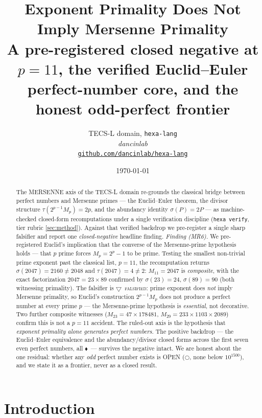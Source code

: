 \documentclass[11pt,a4paper]{article}
\title{
  \textbf{Exponent Primality Does Not Imply Mersenne Primality}\\[4pt]
  \large A pre-registered closed negative at $p=11$, the verified
  Euclid--Euler perfect-number core, and the honest odd-perfect frontier
}
\author{
  TECS-L domain, \texttt{hexa-lang}\\
  \normalsize\textit{dancinlab}\\[2pt]
  \normalsize\href{https://github.com/dancinlab/hexa-lang}{\texttt{github.com/dancinlab/hexa-lang}}
}
\date{\today}
\newcommand{\tierF}{\textcolor{blue!60!black}{$\blacklozenge$}}   %
\newcommand{\tierX}{\textcolor{red!70!black}{$\bigtriangledown$}}  %
\newcommand{\tierO}{\textcolor{orange!85!black}{$\bigcirc$}}       %
\newcommand{\sig}{\sigma}
\newcommand{\Mp}{M_p}
\theoremstyle{definition}
\begin{document}
\maketitle

\begin{abstract}
The MERSENNE axis of the TECS-L domain re-grounds the classical bridge between
perfect numbers and Mersenne primes --- the Euclid--Euler theorem, the divisor
structure $\tau(2^{p-1}\Mp)=2p$, and the abundancy identity
$\sig(P)=2P$ --- as machine-checked closed-form recomputations under a single
verification discipline (\texttt{hexa verify}, tier rubric
\textsection\ref{sec:method}). Against that verified backdrop we pre-register a
single sharp falsifier and report one \emph{closed-negative} headline finding.
\emph{Finding (MR6).} We pre-registered Euclid's implication that the converse of
the Mersenne-prime hypothesis holds --- that $p$ prime forces $\Mp = 2^p-1$ to be
prime. Testing the smallest non-trivial prime exponent past the classical list,
$p=11$, the recomputation returns $\sig(2047)=2160\neq 2048$ and
$\tau(2047)=4\neq 2$: $M_{11}=2047$ is \emph{composite}, with the exact
factorization $2047 = 23\times 89$ confirmed by $\sig(23)=24$, $\sig(89)=90$
(both witnessing primality). The falsifier is \tierX\ \textsc{falsified}: prime
exponent does \emph{not} imply Mersenne primality, so Euclid's construction
$2^{p-1}\Mp$ does not produce a perfect number at every prime $p$ --- the
Mersenne-prime hypothesis is \emph{essential}, not decorative. Two further
composite witnesses ($M_{23}=47\times 178481$, $M_{29}=233\times 1103\times 2089$)
confirm this is not a $p=11$ accident. The ruled-out axis is the hypothesis that
\emph{exponent primality alone generates perfect numbers}. The positive
backdrop --- the Euclid--Euler equivalence and the abundancy/divisor closed forms
across the first seven even perfect numbers, all \tierF\ --- survives the
negative intact. We are honest about the one residual: whether any \emph{odd}
perfect number exists is OPEN (\tierO, none below $10^{1500}$), and we state it
as a frontier, never as a closed result.
\end{abstract}

\section{Introduction}
\label{sec:intro}
\end{document}
